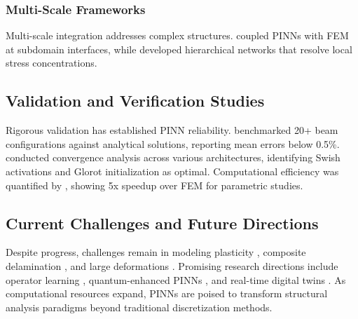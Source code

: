 \documentclass[12pt]{article}
\begin{document}
\subsubsection{Multi-Scale Frameworks}
Multi-scale integration addresses complex structures. \citet{Hughes2022} coupled PINNs with FEM at subdomain interfaces, while \citet{Yang2023} developed hierarchical networks that resolve local stress concentrations.

\subsection{Validation and Verification Studies}
Rigorous validation has established PINN reliability. \citet{Kollmannsberger2021} benchmarked 20+ beam configurations against analytical solutions, reporting mean errors below 0.5\%. \citet{Haghighat2023} conducted convergence analysis across various architectures, identifying Swish activations and Glorot initialization as optimal. Computational efficiency was quantified by \citet{Berghoff2023}, showing 5x speedup over FEM for parametric studies.

\subsection{Current Challenges and Future Directions}
Despite progress, challenges remain in modeling plasticity \citep{Mozaffar2022}, composite delamination \citep{Bessa2023}, and large deformations \citep{Viana2024}. Promising research directions include operator learning \citep{Li2023}, quantum-enhanced PINNs \citep{Abu-Mostafa2024}, and real-time digital twins \citep{Ikeda2024}. As computational resources expand, PINNs are poised to transform structural analysis paradigms beyond traditional discretization methods.

\begin{table}
	\centering
	\captionsetup{justification=centering}
	\caption{More challenges in PINN application to structural problems}
	\label{tab01}
\end{table}
\end{document}
